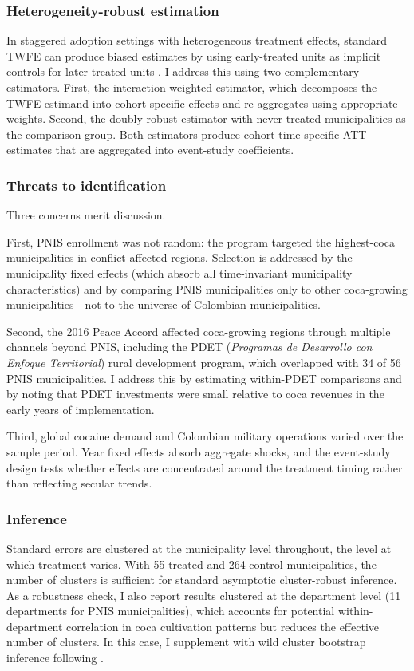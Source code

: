 \documentclass[12pt]{article}
\begin{document}
\subsubsection*{Heterogeneity-robust estimation} In staggered adoption settings with heterogeneous treatment effects, standard TWFE can produce biased estimates by using early-treated units as implicit controls for later-treated units \citep{goodmanbacon2021}. I address this using two complementary estimators. First, the \citet{sunab2021} interaction-weighted estimator, which decomposes the TWFE estimand into cohort-specific effects and re-aggregates using appropriate weights. Second, the \citet{callaway2021} doubly-robust estimator with never-treated municipalities as the comparison group. Both estimators produce cohort-time specific ATT estimates that are aggregated into event-study coefficients.

\subsubsection*{Threats to identification} Three concerns merit discussion.

First, PNIS enrollment was not random: the program targeted the highest-coca municipalities in conflict-affected regions. Selection is addressed by the municipality fixed effects (which absorb all time-invariant municipality characteristics) and by comparing PNIS municipalities only to other coca-growing municipalities---not to the universe of Colombian municipalities.

Second, the 2016 Peace Accord affected coca-growing regions through multiple channels beyond PNIS, including the PDET (\emph{Programas de Desarrollo con Enfoque Territorial}) rural development program, which overlapped with 34 of 56 PNIS municipalities. I address this by estimating within-PDET comparisons and by noting that PDET investments were small relative to coca revenues in the early years of implementation.

Third, global cocaine demand and Colombian military operations varied over the sample period. Year fixed effects absorb aggregate shocks, and the event-study design tests whether effects are concentrated around the treatment timing rather than reflecting secular trends.

\subsubsection*{Inference} Standard errors are clustered at the municipality level throughout, the level at which treatment varies. With 55 treated and 264 control municipalities, the number of clusters is sufficient for standard asymptotic cluster-robust inference. As a robustness check, I also report results clustered at the department level (11 departments for PNIS municipalities), which accounts for potential within-department correlation in coca cultivation patterns but reduces the effective number of clusters. In this case, I supplement with wild cluster bootstrap inference following \citet{cameron2008}.
\end{document}

